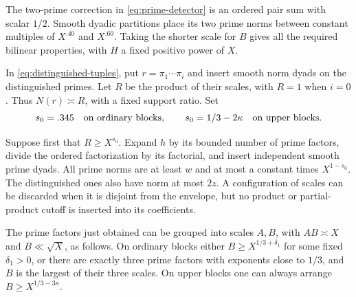 The two-prime correction in \eqref{eq:prime-detector} is an ordered
pair sum with scalar $1/2$.  Smooth dyadic partitions place its two
prime norms between constant multiples of $X^{.40}$ and $X^{.60}$.
Taking the shorter scale for $B$ gives all the required bilinear
properties, with $H$ a fixed positive power of $X$.

In \eqref{eq:distinguished-tuples}, put $r=\pi_1\cdots\pi_i$ and
insert smooth norm dyads on the distinguished primes.  Let $R$ be
the product of their scales, with $R=1$ when $i=0$.  Thus $N(r)\asymp R$,
with a fixed support ratio.  Set
\[
 s_0=.345\quad\hbox{on ordinary blocks},\qquad
 s_0=1/3-2\kappa\quad\hbox{on upper blocks}.
\]

Suppose first that $R\ge X^{s_0}$.  Expand $h$ by its bounded number
of prime factors, divide the ordered factorization by its factorial,
and insert independent smooth prime dyads.  All prime norms are at
least $w$ and at most a constant times $X^{1-s_0}$.  The distinguished
ones also have norm at most $2z$.  A configuration of scales can be
discarded when it is disjoint from the envelope, but no product or
partial-product cutoff is inserted into its coefficients.

\begin{lemma}\label{lem:prime-grouping}
The prime factors just obtained can be grouped into scales $A,B$,
with $AB\asymp X$ and $B\ll\sqrt X$, as follows.  On ordinary blocks
either $B\ge X^{1/3+\delta_1}$ for some fixed $\delta_1>0$, or there
are exactly three prime factors with exponents close to $1/3$, and
$B$ is the largest of their three scales.  On upper blocks one can
always arrange $B\ge X^{1/3-3\kappa}$.
\end{lemma}

